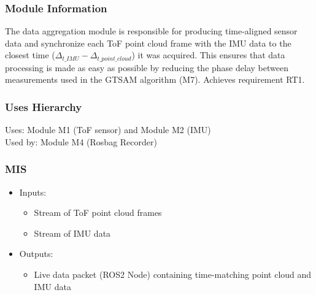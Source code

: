 \documentclass[11pt]{article}
\begin{document}
			\subsubsection{Module Information}
			The data aggregation module is responsible for producing time-aligned sensor data and synchronize each ToF point cloud frame with the IMU data to the closest time ($\Delta_{t\_IMU} - \Delta_{t\_point\_cloud}$) it was acquired. This ensures that data processing is made as easy as possible by reducing the phase delay between measurements used in the GTSAM algorithm (M7). Achieves requirement RT1.
			\subsubsection{Uses Hierarchy}
				Uses: Module M1 (ToF sensor) and Module M2 (IMU)\\ 
				Used by: Module M4 (Rosbag Recorder)
			\subsubsection{MIS}
				\begin{itemize}
					\item Inputs:
						\begin{itemize}
							\item Stream of ToF point cloud frames 
							\item Stream of IMU data 
						\end{itemize} 
					\item Outputs:
						\begin{itemize}
							\item Live data packet (ROS2 Node) containing time-matching point cloud and IMU data
						\end{itemize}
				\end{itemize}
\end{document}
